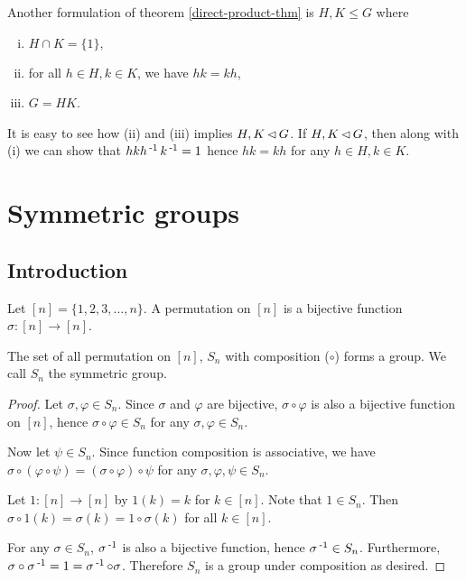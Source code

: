 \documentclass[12pt]{article}
\begin{document}
	\begin{remark}
		Another formulation of theorem \ref{direct-product-thm} is $H,K\leq G$ where
		\begin{enumerate}[(i)]
			\item $H\cap K = \{1\},$
			\item for all $h\in H,k\in K$, we have $hk=kh$,
			\item $G=HK$.
		\end{enumerate}
		It is easy to see how (ii) and (iii) implies $H,K\operatorname{\vartriangleleft} G$. If $H,K\operatorname{\vartriangleleft} G$, then along with (i) we can show that $hkh\operatorname{^{-1}} k\operatorname{^{-1}} = 1$ hence $hk=kh$ for any $h\in H, k\in K$.
	\end{remark}

\newpage
\section{Symmetric groups}

\subsection{Introduction}
	\begin{define}
		Let $[n] = \{1,2,3,\dots,n\}$. A permutation on $[n]$ is a bijective function $\sigma: [n] \to [n]$.
	\end{define}

	\begin{theorem}
		The set of all permutation on $[n]$, $S_n$ with composition ($\circ$) forms a group. We call $S_n$ the symmetric group.
	\end{theorem}
	\begin{proof}
		Let $\sigma,\varphi\in S_n$. Since $\sigma$ and $\varphi$ are bijective, $\sigma \circ \varphi$ is also a bijective function on $[n]$, hence $\sigma \circ \varphi \in S_n$ for any $\sigma, \varphi \in S_n$.

		Now let $\psi \in S_n$. Since function composition is associative, we have $\sigma \circ (\varphi \circ \psi) = (\sigma \circ \varphi) \circ \psi$ for any $\sigma, \varphi, \psi \in S_n$.

		Let $1 : [n] \to [n]$ by $1(k) = k$ for $k\in [n]$. Note that $1\in S_n$. Then $\sigma \circ 1 (k) = \sigma(k) = 1\circ \sigma(k)$ for all $k\in [n]$.

		For any $\sigma \in S_n$, $\sigma\operatorname{^{-1}}$ is also a bijective function, hence $\sigma\operatorname{^{-1}} \in S_n$. Furthermore, $\sigma \circ \sigma\operatorname{^{-1}} = 1 = \sigma\operatorname{^{-1}} \circ \sigma$. Therefore $S_n$ is a group under composition as desired.
	\end{proof}
\end{document}
